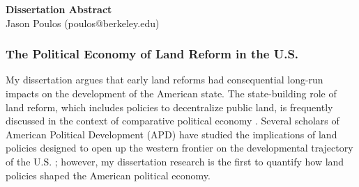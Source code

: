 \documentclass[12pt,letterpaper]{article}
\begin{document}
\pagestyle{fancy}
\rhead{\thepage}
\cfoot{}
\lhead{}
\rhead{}
\renewcommand{\headrulewidth}{0pt} 
\renewcommand{\footrulewidth}{0pt} 


\pagestyle{fancy}
\lhead{\textcolor{gray}{\it Jason Poulos}}
\rhead{\textcolor{gray}{\thepage/\totalpages{}}}

\begin{small}

\begin{center}
{\LARGE \bf Dissertation Abstract}\\
\vspace*{0.1cm}
{\normalsize Jason Poulos (poulos@berkeley.edu)}
\end{center}



\subsubsection*{The Political Economy of Land Reform in the U.S.}

My dissertation argues that early land reforms had consequential long-run impacts on the development of the American state. The state-building role of land reform, which includes policies to decentralize public land, is frequently discussed in the context of comparative political economy \citep[e.g.,][]{albertus2015autocracy,murtazashvili2016does}. Several scholars of American Political Development (APD) have studied the implications of land policies designed to open up the western frontier on the developmental trajectory of the U.S. \citep[e.g.,][]{bensel1990,frymer2014rush}; however, my dissertation research is the first to quantify how land policies shaped the American political economy. 


\end{small}
\end{document}
